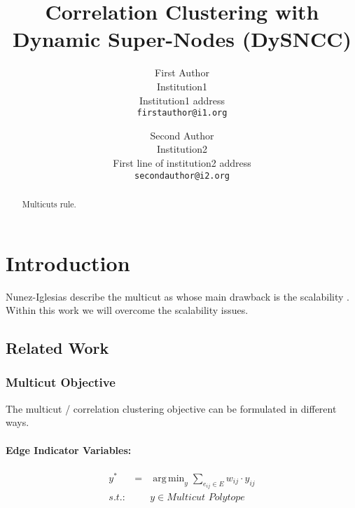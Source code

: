 \documentclass[10pt,twocolumn,letterpaper]{article}
\DeclareMathOperator*{\argmin}{arg\,min}
\begin{document}

\title{Correlation Clustering with Dynamic Super-Nodes (DySNCC)}

\author{First Author\\
Institution1\\
Institution1 address\\
{\tt\small firstauthor@i1.org}
\and
Second Author\\
Institution2\\
First line of institution2 address\\
{\tt\small secondauthor@i2.org}
}

\maketitle

\begin{abstract}
   Multicuts rule.
\end{abstract}
\section{Introduction}
    
  Nunez-Iglesias \etal describe the multicut as
   whose 
  main drawback is the scalability \cite{nunez_iglesias_2013}.
  Within this work we will overcome the scalability issues.



\subsection{Related Work}


\subsubsection{Multicut Objective}

The multicut / correlation clustering objective 
can be formulated in different ways.



\paragraph{Edge Indicator Variables:}
\begin{center}
    \begin{eqnarray}
        y^* &=& \argmin_{y} \sum_{ e_{ij} \in E } w_{ij} \cdot y_{ij} \\
        s.t.:& & y \in \textit{Multicut Polytope} \nonumber
    \end{eqnarray}
\end{center}
\end{document}
